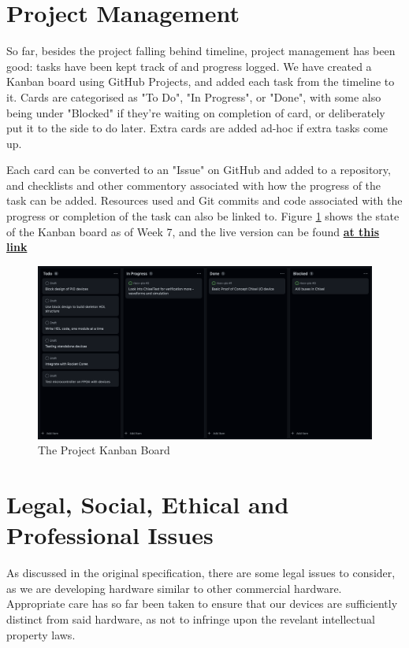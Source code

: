 \documentclass[a4paper,fleqn,12pt]{article}
\begin{document}
\section{Project Management}

So far, besides the project falling behind timeline, project management has been good: tasks have been kept track of and progress logged. We have created a Kanban board using GitHub Projects, and added each task from the timeline to it. Cards are categorised as "To Do", "In Progress", or "Done", with some also being under "Blocked" if they're waiting on completion of card, or deliberately put it to the side to do later. Extra cards are added ad-hoc if extra tasks come up.

Each card can be converted to an "Issue" on GitHub and added to a repository, and checklists and other commentory associated with how the progress of the task can be added. Resources used and Git commits and code associated with the progress or completion of the task can also be linked to. Figure \ref{fig:kanban} shows the state of the Kanban board as of Week 7, and the live version can be found \href{https://github.com/users/Joeyh021/projects/2}{\textbf{at this link}}

\begin{figure}[h!]
	\centering
	\includegraphics[width=\textwidth]{../img/kanban-wk6.png}
	\caption{The Project Kanban Board}
	\label{fig:kanban}
\end{figure}

\section{Legal, Social, Ethical and Professional Issues}

As discussed in the original specification, there are some legal issues to consider, as we are developing hardware similar to other commercial hardware. Appropriate care has so far been taken to ensure that our devices are sufficiently distinct from said hardware, as not to infringe upon the revelant intellectual property laws.
\end{document}
